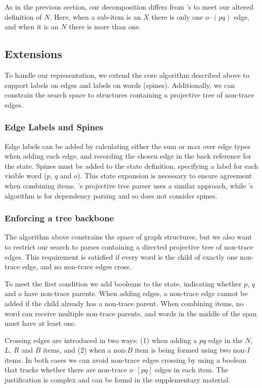 As in the previous section, our decomposition differs from \textcite{ec}'s to meet our altered definition of $N$.
Here, when a sub-item is an $X$ there is only one $o$--$(pq)$ edge, and when it is an $N$ there is more than one.

\subsection{Extensions}
To handle our representation, we extend the core algorithm described above to support labels on edges and labels on words (spines).
Additionally, we can constrain the search space to structures containing a projective tree of non-trace edges.

\subsubsection{Edge Labels and Spines}\label{sec:labels}
Edge labels can be added by calculating either the sum or max over edge types when adding each edge, and recording the chosen edge in the back reference for the state.
Spines must be added to the state definition, specifying a label for each visible word ($p$, $q$ and $o$).
This state expansion is necessary to ensure agreement when combining items.
\textcite{cck}'s projective tree parser uses a similar approach, while \textcite{ec}'s algorithm is for dependency parsing and so does not consider spines.

\subsubsection{Enforcing a tree backbone}
The algorithm above constrains the space of graph structures, but we also want to restrict our search to parses containing a directed projective tree of non-trace edges.
This requirement is satisfied if every word is the child of exactly one non-trace edge, and no non-trace edges cross.

To meet the first condition we add booleans to the state, indicating whether $p$, $q$ and $o$ have non-trace parents.
When adding edges, a non-trace edge cannot be added if the child already has a non-trace parent.
When combining items, no word can receive multiple non-trace parents, and words in the middle of the span must have at least one.

Crossing edges are introduced in two ways:
(1) when adding a $pq$ edge in the $N$, $L$, $R$ and $B$ items, and
(2) when a non-$B$ item is being formed using two non-$I$ items.
In both cases we can avoid non-trace edges crossing by using a boolean that tracks whether there are non-trace $o$--$[pq]$ edges in each item.
The justification is complex and can be found in the supplementary material.

